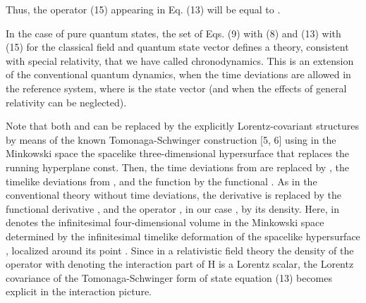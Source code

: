\documentclass[a4paper,12pt]{article}
\begin{document}
\ni Thus, the operator (15) appearing in Eq. (13) will be equal to \coordHE{}.

In the case of pure quantum states, the set of Eqs. (9) with (8) and (13) with (15) for the classical field \coordHE{} and quantum state vector \coordHE{} defines a theory, consistent with special relativity, that we have called chronodynamics. This is an extension of the conventional quantum dynamics, when the time deviations \coordHE{} are allowed in the reference system, where \coordHE{} is the state vector (and when the effects of general relativity can be neglected).

Note that both \coordHE{} and \coordHE{} can be replaced by the explicitly Lorentz-covariant structures by means of the known Tomonaga-Schwinger construction [5, 6] using in the Minkowski space the spacelike three-dimensional hypersurface \coordHE{} that replaces the running hyperplane \coordHE{} const. Then, the time deviations \coordHE{} from \coordHE{} are replaced by \coordHE{}, the timelike deviations from \coordHE{}, and the function \coordHE{} by the functional \myHighlight{$\psi[\sigma]$}\coordHE{}. As in the conventional theory without time deviations, the derivative \coordHE{} is replaced by the functional derivative \coordHE{}, and the operator \coordHE{}, in our case \coordHE{}, by its density. Here, \coordHE{} in \coordHE{} denotes the infinitesimal four-dimensional volume in the Minkowski space determined by the infinitesimal timelike deformation of the spacelike hypersurface \coordHE{}, localized around its point \coordHE{}. Since in a relativistic field theory the density of the operator \coordHE{} with \coordHE{} denoting the interaction part of H is a Lorentz scalar, the Lorentz covariance of the Tomonaga-Schwinger form of state equation (13) becomes explicit in the interaction picture.
\end{document}
